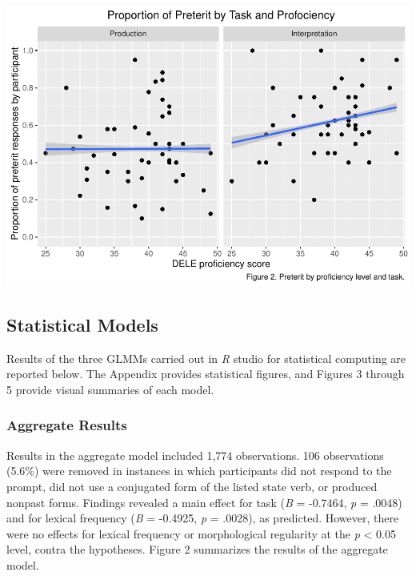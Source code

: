 \documentclass[
  english,
  man]{apa6}
\begin{document}
\includegraphics{Manuscript_files/figure-latex/generate-prof-plot-1.pdf}

\hypertarget{statistical-models}{%
\subsection{Statistical Models}\label{statistical-models}}

Results of the three GLMMs carried out in \emph{R} studio for statistical computing are reported below. The Appendix provides statistical figures, and Figures 3 through 5 provide visual summaries of each model.

\hypertarget{aggregate-results}{%
\subsubsection{Aggregate Results}\label{aggregate-results}}

Results in the aggregate model included 1,774 observations. 106 observations (5.6\%) were removed in instances in which participants did not respond to the prompt, did not use a conjugated form of the listed state verb, or produced nonpast forms. Findings revealed a main effect for task (\emph{B} = -0.7464, \emph{p} = .0048) and for lexical frequency (\emph{B} = -0.4925, \emph{p} = .0028), as predicted. However, there were no effects for lexical frequency or morphological regularity at the \emph{p} \textless{} 0.05 level, contra the hypotheses. Figure 2 summarizes the results of the aggregate model.
\end{document}
